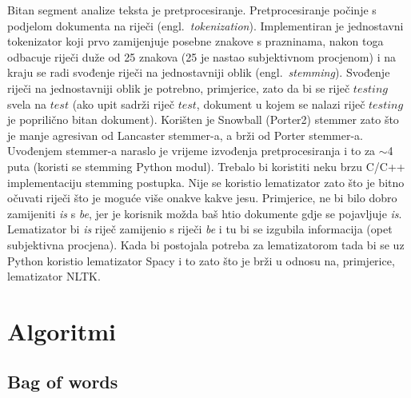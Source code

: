 \documentclass[a4paper,12pt]{article}
\newcommand{\engl}[1]{(engl.~\emph{#1})}
\begin{document}
Bitan segment analize teksta je pretprocesiranje. Pretprocesiranje počinje s podjelom dokumenta na riječi \engl{tokenization}. Implementiran je jednostavni tokenizator koji prvo zamijenjuje posebne znakove s prazninama, nakon toga odbacuje riječi duže od 25 znakova (25 je nastao subjektivnom procjenom) i na kraju se radi svođenje riječi na jednostavniji oblik \engl{stemming}. Svođenje riječi na jednostavniji oblik je potrebno, primjerice, zato da bi se riječ $testing$ svela na $test$ (ako upit sadrži riječ $test$, dokument u kojem se nalazi riječ $testing$ je poprilično bitan dokument). Korišten je Snowball (Porter2) stemmer zato što je manje agresivan od Lancaster stemmer-a, a brži od Porter stemmer-a. Uvođenjem stemmer-a naraslo je vrijeme izvođenja pretprocesiranja i to za $\sim$4 puta (koristi se stemming Python modul). Trebalo bi koristiti neku brzu C/C++ implementaciju stemming postupka. Nije se koristio lematizator zato što je bitno očuvati riječi što je moguće više onakve kakve jesu. Primjerice, ne bi bilo dobro zamijeniti \textit{is} s \textit{be}, jer je korisnik možda baš htio dokumente gdje se pojavljuje \textit{is}. Lematizator bi \textit{is} riječ zamijenio s riječi \textit{be} i tu bi se izgubila informacija (opet subjektivna procjena). Kada bi postojala potreba za lematizatorom tada bi se uz Python koristio lematizator Spacy i to zato što je brži u odnosu na, primjerice, lematizator NLTK. 

\section{Algoritmi}

\subsection{Bag of words}
\end{document}
